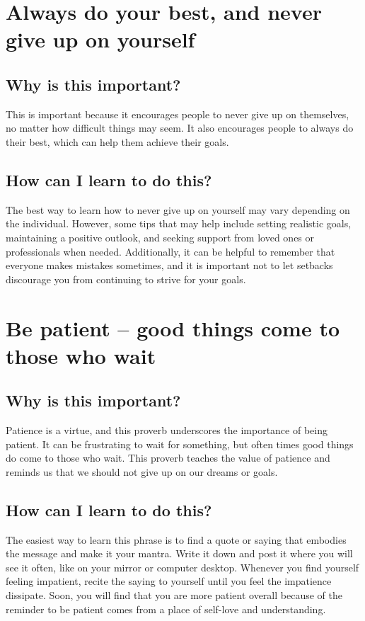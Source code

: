\documentclass[11pt]{article}
\begin{document}
\section{Always do your best, and never give up on yourself}
\label{sec:org42be956}
\subsection{Why is this important?}
\label{sec:org2f81eea}
This is important because it encourages people to never give up on themselves, no matter how difficult things may seem. It also encourages people to always do their best, which can help them achieve their goals.

\subsection{How can I learn to do this?}
\label{sec:org8c67fc0}
The best way to learn how to never give up on yourself may vary depending on the individual. However, some tips that may help include setting realistic goals, maintaining a positive outlook, and seeking support from loved ones or professionals when needed. Additionally, it can be helpful to remember that everyone makes mistakes sometimes, and it is important not to let setbacks discourage you from continuing to strive for your goals.

\section{Be patient – good things come to those who wait}
\label{sec:org2f5ac85}
\subsection{Why is this important?}
\label{sec:org4a6a24c}
Patience is a virtue, and this proverb underscores the importance of being patient. It can be frustrating to wait for something, but often times good things do come to those who wait. This proverb teaches the value of patience and reminds us that we should not give up on our dreams or goals.

\subsection{How can I learn to do this?}
\label{sec:orga8a2ce4}
The easiest way to learn this phrase is to find a quote or saying that embodies the message and make it your mantra. Write it down and post it where you will see it often, like on your mirror or computer desktop. Whenever you find yourself feeling impatient, recite the saying to yourself until you feel the impatience dissipate. Soon, you will find that you are more patient overall because of the reminder to be patient comes from a place of self-love and understanding.
\end{document}
